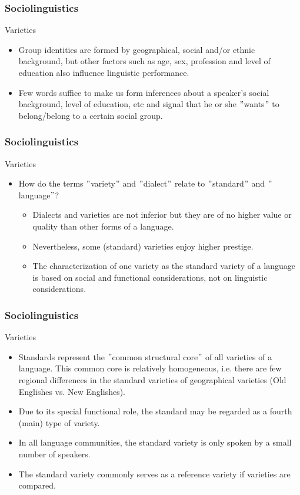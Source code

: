 \documentclass[12pt, table]{beamer}
\begin{document}
\begin{frame}
\frametitle{Sociolinguistics}
Varieties
\begin{itemize}
\item Group identities are formed by geographical, social and/or ethnic background, but other factors such as age, sex, profession and level of education also influence linguistic performance.
\item Few words suffice to make us form inferences about a speaker's social background, level of education, etc and signal that he or she $"$wants$"$ to belong/belong to a certain social group.
\end{itemize}
\end{frame}

\begin{frame}
\frametitle{Sociolinguistics}
Varieties
\begin{itemize}
\item How do the terms $"$variety$"$ and $"$dialect$"$ relate to $"$standard$"$ and $"$language$"$?
\begin{itemize}
\item Dialects and varieties are not inferior but they are of no higher value or quality than other forms of a language. 
\item Nevertheless, some (standard) varieties enjoy higher prestige.
\item The characterization of one variety as the standard variety of a language is based on social and functional considerations, not on linguistic considerations.
\end{itemize}
\end{itemize}
\end{frame}

\begin{frame}
\frametitle{Sociolinguistics}
Varieties
\begin{itemize}
\item Standards represent the $"$common structural core$"$ of all varieties of a language. This common core is relatively homogeneous, i.e. there are few regional differences in the standard varieties of geographical varieties (Old Englishes vs. New Englishes).
\item Due to its special functional role, the standard may be regarded as a fourth (main) type of variety.
\item In all language communities, the standard variety is only spoken by a small number of speakers.
\item The standard variety commonly serves as a reference variety if varieties are compared.
\end{itemize}
\end{frame}
\end{document}
